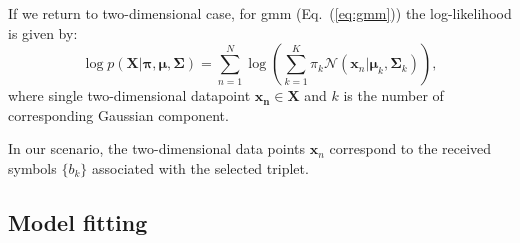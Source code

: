 If we return to two-dimensional case, for \gls{gmm} (Eq.~(\ref{eq:gmm})) the log-likelihood is given by:
\begin{equation}
\log p(\mathbf{X} | \boldsymbol{\pi}, \boldsymbol{\mu}, \boldsymbol{\Sigma}) = \sum_{n=1}^N \log \left( \sum_{k=1}^K \pi_k \mathcal{N}(\mathbf{x}_n | \boldsymbol{\mu}_k, \boldsymbol{\Sigma}_k) \right) {,}
\label{eq:loglik}
\end{equation}
where single two-dimensional datapoint $\mathbf{x_n} \in \mathbf{X}$ and \(k\) is the number of corresponding Gaussian component.

In our scenario, the two-dimensional data points $\mathbf{x}_n$ correspond to the received symbols $\{b_k\}$ associated with the selected triplet.

\subsection{Model fitting}

